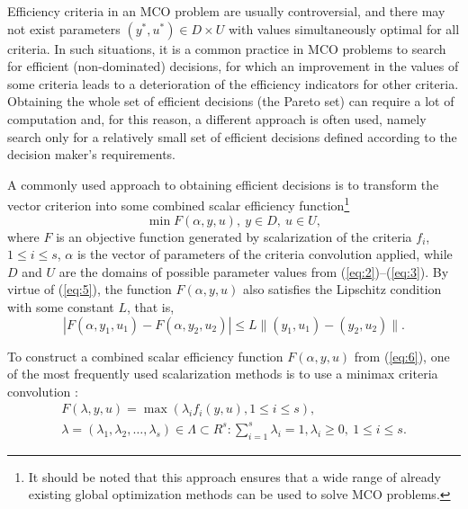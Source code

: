 \documentclass{svproc}
\begin{document}
Efficiency criteria in an MCO problem are usually controversial, and there may not exist parameters $(y^*,u^*) \in D \times U$ with values simultaneously optimal for all criteria. In such situations, it is a common practice in MCO problems to search for efficient (non-dominated) decisions, for which an improvement in the values of some criteria leads to a deterioration of the efficiency indicators for other criteria. Obtaining the whole set of efficient decisions (the Pareto set) can require a lot of computation and, for this reason, a different approach is often used, namely search only for a relatively small set of efficient decisions defined according to the decision maker's requirements.

A commonly used approach to obtaining efficient decisions is to transform the vector criterion into some combined scalar efficiency function\footnote{It should be noted that this approach ensures that a wide range of already existing global optimization methods can be used to solve MCO problems.}
\begin{equation}\label{eq:6}
  \min{F(\alpha,y,u)},\ y \in D,\ u \in U,
\end{equation}
where $F$ is an objective function generated by scalarization of the criteria $f_i$, $1 \leq i \leq s$, $\alpha$ is the vector of parameters of the criteria convolution applied, while $D$ and $U$ are the domains of possible parameter values from (\ref{eq:2})--(\ref{eq:3}). By virtue of (\ref{eq:5}), the function $F(\alpha, y, u)$ also satisfies the Lipschitz condition with some constant $L$, that is,
\begin{equation}\label{eq:7}
  |F(\alpha, y_1, u_1)-F(\alpha, y_2, u_2)| \leq L\|(y_1,u_1)-(y_2,u_2)\|.
\end{equation}

To construct a combined scalar efficiency function $F(\alpha,y,u)$ from (\ref{eq:6}), one of the most frequently used scalarization methods is to use a minimax criteria convolution \cite{c2,c5}:
\begin{equation}\label{eq:8}
\begin{matrix}
  F(\lambda,y,u)=\max{(\lambda_i f_i (y,u),1\leq i \leq s)},\\
  \lambda=(\lambda_1,\lambda_2, \dots, \lambda_s)\in \Lambda \subset R^s: \sum_{i=1}^{s}\lambda_i=1, \lambda_i \geq 0,\ 1 \leq i \leq s.
\end{matrix}
\end{equation}
\end{document}
